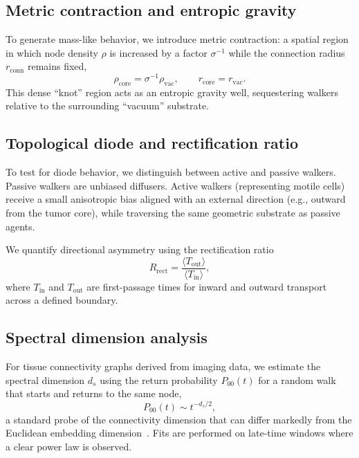 \documentclass[aps,pre,twocolumn,superscriptaddress,10pt,floatfix]{revtex4-2}
\begin{document}
\subsection{Metric contraction and entropic gravity}

To generate mass-like behavior, we introduce metric contraction: a spatial region in which node density $\rho$ is increased by a factor $\sigma^{-1}$ while the connection radius $r_{\mathrm{conn}}$ remains fixed,
\begin{equation}
  \rho_{\mathrm{core}} = \sigma^{-1} \rho_{\mathrm{vac}},
  \qquad
  r_{\mathrm{core}} = r_{\mathrm{vac}} .
  \label{eq:metric_contraction}
\end{equation}
This dense ``knot'' region acts as an entropic gravity well, sequestering walkers relative to the surrounding ``vacuum'' substrate.

\subsection{Topological diode and rectification ratio}

To test for diode behavior, we distinguish between active and passive walkers. Passive walkers are unbiased diffusers. Active walkers (representing motile cells) receive a small anisotropic bias aligned with an external direction (e.g., outward from the tumor core), while traversing the same geometric substrate as passive agents.

We quantify directional asymmetry using the rectification ratio
\begin{equation}
  R_{\mathrm{rect}} = \frac{\langle T_{\mathrm{out}} \rangle}{\langle T_{\mathrm{in}} \rangle},
  \label{eq:Rrect}
\end{equation}
where $T_{\mathrm{in}}$ and $T_{\mathrm{out}}$ are first-passage times for inward and outward transport across a defined boundary.

\subsection{Spectral dimension analysis}

For tissue connectivity graphs derived from imaging data, we estimate the spectral dimension $d_s$ using the return probability $P_{00}(t)$ for a random walk that starts and returns to the same node,
\begin{equation}
  P_{00}(t) \sim t^{-d_s/2},
  \label{eq:ds}
\end{equation}
a standard probe of the connectivity dimension that can differ markedly from the Euclidean embedding dimension~\cite{alexander1982,havlin2002}. Fits are performed on late-time windows where a clear power law is observed.
\end{document}
